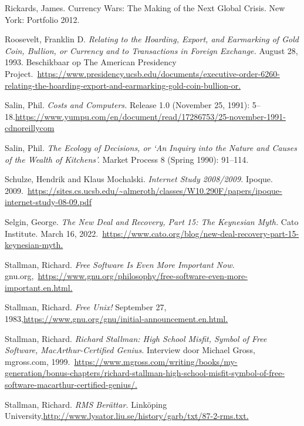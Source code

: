 \documentclass[smalldemyvopaper,11pt,twoside,onecolumn,openright,extrafontsizes,hidelinks]{memoir}
\begin{document}
Rickards, James. Currency Wars: The Making of the Next Global Crisis.
New York: Portfolio 2012.

Roosevelt, Franklin D. \emph{Relating to the Hoarding, Export, and
Earmarking of Gold Coin, Bullion, or Currency and to Transactions in
Foreign Exchange.} August 28, 1993. Beschikbaar op The American
Presidency
Project.~\url{https://www.presidency.ucsb.edu/documents/executive-order-6260-relating-the-hoarding-export-and-earmarking-gold-coin-bullion-or.}

Salin, Phil. \emph{Costs and Computers.} Release 1.0 (November 25,
1991):
5--18.\url{https://www.yumpu.com/en/document/read/17286753/25-november-1991-cdnoreillycom}

Salin, Phil. \emph{The Ecology of Decisions, or `An Inquiry into the
Nature and Causes of the Wealth of Kitchens'.} Market Process 8 (Spring
1990): 91--114.

Schulze, Hendrik and Klaus Mochalski. \emph{Internet Study 2008/2009.}
Ipoque.
2009.~\url{https://sites.cs.ucsb.edu/~almeroth/classes/W10.290F/papers/ipoque-internet-study-08-09.pdf}

Selgin, George. \emph{The New Deal and Recovery, Part 15: The Keynesian
Myth.} Cato Institute. March 16,
2022.~\href{https://www.cato.org/blog/new-deal-recovery-part-15-keynesian-myth}{https://www.cato.org/blog/new-deal-recovery-part-15-keynesian-myth.}

Stallman, Richard. \emph{Free Software Is Even More Important Now.}
gnu.org,~\href{https://www.gnu.org/philosophy/free-software-even-more-important.en.html}{https://www.gnu.org/philosophy/free-software-even-more-important.en.html.}

Stallman, Richard. \emph{Free Unix!} September 27,
1983,\href{https://www.gnu.org/gnu/initial-announcement.en.html}{https://www.gnu.org/gnu/initial-announcement.en.html.}

Stallman, Richard. \emph{Richard Stallman: High School Misfit, Symbol of
Free Software, MacArthur-Certified Genius.} Interview door Michael
Gross, mgross.com,
1999.~\href{https://www.mgross.com/writing/books/my-generation/bonus-chapters/richard-stallman-high-school-misfit-symbol-of-free-software-macarthur-certified-genius/}{https://www.mgross.com/writing/books/my-generation/bonus-chapters/richard-stallman-high-school-misfit-symbol-of-free-software-macarthur-certified-genius/.}

Stallman, Richard. \emph{RMS Berättar.} Linköping
University,\href{http://www.lysator.liu.se/history/garb/txt/87-2-rms.txt}{http://www.lysator.liu.se/history/garb/txt/87-2-rms.txt.}
\end{document}
